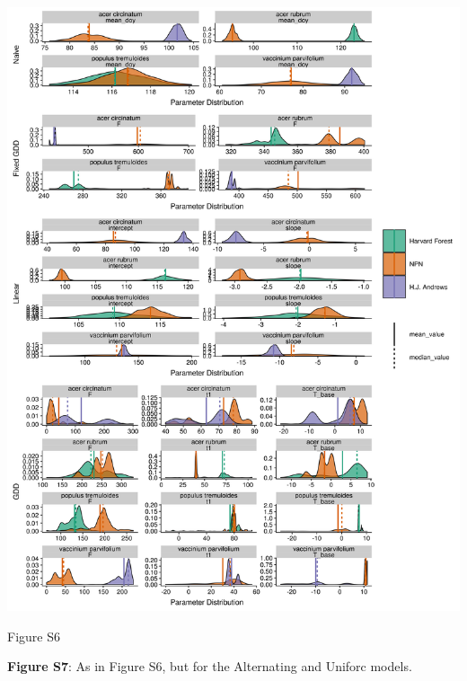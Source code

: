 \documentclass[a4paper,12pt]{article}
\begin{document}
\begin{center}
	\centering
		\includegraphics[scale=0.5]{supplement_select_species_param_comparison1.png}
	\caption{Figure S6}
\end{center}

\newpage

\textbf{Figure S7}: As in Figure S6, but for the Alternating and Uniforc models. 

\newpage
\end{document}
